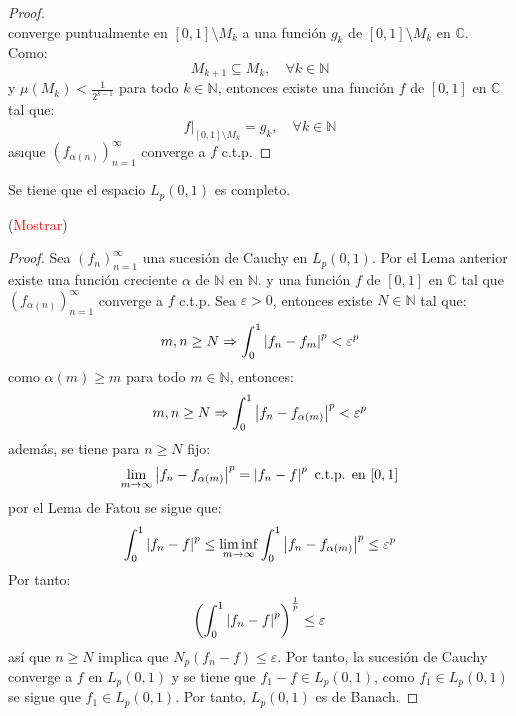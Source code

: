 \documentclass[twoside,12pt,a4 paper,openright]{book}
\begin{document}
\begin{enumerate}
\begin{proof}
\begin{equation*}
        \end{equation*}
        converge puntualmente en $[0,1]\setminus M_k$ a una funci\'on $g_k$ de $[0,1]\setminus M_k$ en $\mathbb{C}$. Como:
        \begin{equation*}
            M_{ k+1}\subseteq M_k,\quad\forall k\in\mathbb{N}
        \end{equation*}
        y $\mu(M_k)<\frac{1}{2^{ k-1}}$ para todo $k\in\mathbb{N}$, entonces existe una funci\'on $f$ de $[0,1]$ en $\mathbb{C}$ tal que:
        \begin{equation*}
            f\Big|_{[0,1]\setminus M_k}=g_k,\quad\forall k\in\mathbb{N}
        \end{equation*}
        as\i que $\left(f_{\alpha(n)} \right)_{ n=1}^\infty$ converge a $f$ c.t.p.
    \end{proof}

    Se tiene que el espacio $L_p(0,1)$ es completo.

    (\textcolor{red}{Mostrar})

    \begin{proof}
        Sea $\left(f_{n} \right)_{ n=1}^\infty$ una sucesi\'on de Cauchy en $L_p(0,1)$. Por el Lema anterior existe una funci\'on creciente $\alpha$ de $\mathbb{N}$ en $\mathbb{N}$. y  una funci\'on $f$ de $[0,1]$ en $\mathbb{C}$ tal que $\left(f_{\alpha(n)} \right)_{ n=1}^\infty$ converge a $f$ c.t.p. Sea $\varepsilon>0$, entonces existe $N\in\mathbb{N}$ tal que:
        \begin{equation*}
            m,n\geq N\Rightarrow \int_{0}^{1}\left|f_n-f_m\right|^p<\varepsilon^{p}
        \end{equation*}
        como $\alpha(m)\geq m$ para todo $m\in\mathbb{N}$, entonces:
        \begin{equation*}
            m,n\geq N\Rightarrow \int_{0}^{1}\left|f_n-f_{\alpha(m)}\right|^p<\varepsilon^{p}
        \end{equation*}
        adem\'as, se tiene para $n\geq N$ fijo:
        \begin{equation*}
            \lim_{ m\rightarrow\infty}\left|f_n-f_{\alpha(m)}\right|^p=\left|f_n-f\right|^p\textup{ c.t.p. en }[0,1]
        \end{equation*}
        por el Lema de Fatou se sigue que:
        \begin{equation*}
            \int_{0}^{1}\left|f_n-f\right|^p\leq\liminf_{ m\rightarrow\infty}\int_{0}^{1}\left|f_n-f_{\alpha(m)}\right|^p\leq\varepsilon^p
        \end{equation*}
        Por tanto:
        \begin{equation*}
            \left(\int_{0}^{1}\left|f_n-f\right|^p\right)^{\frac{1}{p}}\leq\varepsilon
        \end{equation*}
        as\'i que $n\geq N$ implica que $N_p(f_n-f)\leq\varepsilon$. Por tanto, la sucesi\'on de Cauchy converge a $f$ en $L_p(0,1)$ y se tiene que $f_1-f\in L_p(0,1)$, como $f_1\in L_p(0,1)$ se sigue que $f_1\in L_p(0,1)$. Por tanto, $L_p(0,1)$ es de Banach.
    \end{proof}


\end{enumerate}
\end{document}
